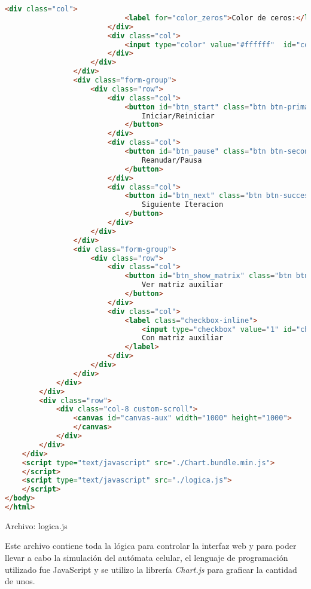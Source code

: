 \documentclass[a4paper,12pt]{article}
\begin{document}
\begin{lstlisting}[language=html]
                        <div class="col">
                            <label for="color_zeros">Color de ceros:</label>
                        </div>
                        <div class="col">
                            <input type="color" value="#ffffff"  id="color_zeros">
                        </div>
                    </div>
                </div>
                <div class="form-group">
                    <div class="row">
                        <div class="col">
                            <button id="btn_start" class="btn btn-primary btn-sm">
                                Iniciar/Reiniciar
                            </button>
                        </div>
                        <div class="col">
                            <button id="btn_pause" class="btn btn-secondary btn-sm">
                                Reanudar/Pausa
                            </button>
                        </div>
                        <div class="col">
                            <button id="btn_next" class="btn btn-success btn-sm">
                                Siguiente Iteracion
                            </button>
                        </div>
                    </div>
                </div>
                <div class="form-group">
                    <div class="row">
                        <div class="col">
                            <button id="btn_show_matrix" class="btn btn-warning btn-sm">
                                Ver matriz auxiliar
                            </button>
                        </div>
                        <div class="col">
                            <label class="checkbox-inline">
                                <input type="checkbox" value="1" id="check-matrix">
                                Con matriz auxiliar
                            </label>
                        </div>
                    </div>
                </div>
            </div>
        </div>
        <div class="row">
            <div class="col-8 custom-scroll">
                <canvas id="canvas-aux" width="1000" height="1000">
                </canvas>
            </div>
        </div>
    </div>
    <script type="text/javascript" src="./Chart.bundle.min.js">
    </script>
    <script type="text/javascript" src="./logica.js">
    </script>
</body>
</html>
\end{lstlisting}

Archivo: logica.js

Este archivo contiene toda la lógica para controlar la interfaz web y para poder llevar a cabo la simulación del autómata celular, el lenguaje de programación utilizado fue JavaScript y se utilizo la librería \emph{Chart.js} para graficar la cantidad de unos.
\end{document}
